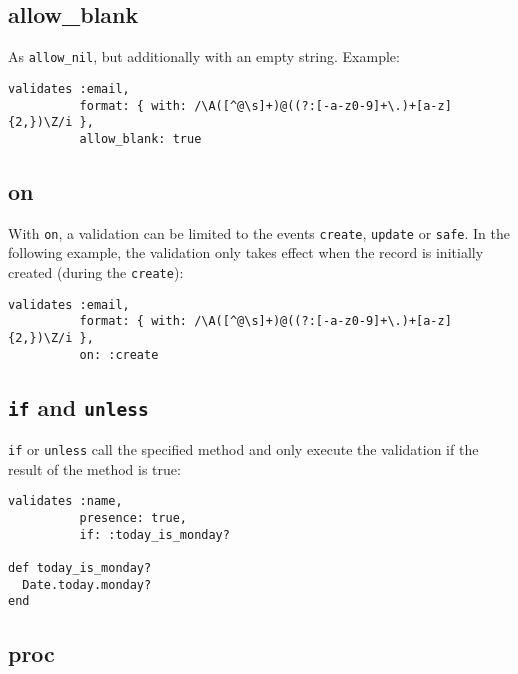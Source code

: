 \documentclass[a4paper]{book}
\begin{document}
\subsection{allow\_blank}\label{allowux5fblank}

As \texttt{allow\_nil}, but additionally with an empty string. Example:

\begin{shaded}\begin{verbatim}
validates :email,
          format: { with: /\A([^@\s]+)@((?:[-a-z0-9]+\.)+[a-z]{2,})\Z/i },
          allow_blank: true
\end{verbatim}\end{shaded}

\subsection{on}\label{on}

With \texttt{on}, a validation can be limited to the events \texttt{create}, \texttt{update} or \texttt{safe}. In the following example, the validation only takes effect when the record is initially created (during the \texttt{create}):

\begin{shaded}\begin{verbatim}
validates :email,
          format: { with: /\A([^@\s]+)@((?:[-a-z0-9]+\.)+[a-z]{2,})\Z/i },
          on: :create
\end{verbatim}\end{shaded}

\subsection{\texttt{if} and \texttt{unless}}\label{if-and-unless}

\texttt{if} or \texttt{unless} call the specified method and only execute the validation if the result of the method is true:

\begin{shaded}\begin{verbatim}
validates :name,
          presence: true,
          if: :today_is_monday?

def today_is_monday?
  Date.today.monday?
end
\end{verbatim}\end{shaded}

\subsection{proc}\label{proc}
\end{document}
